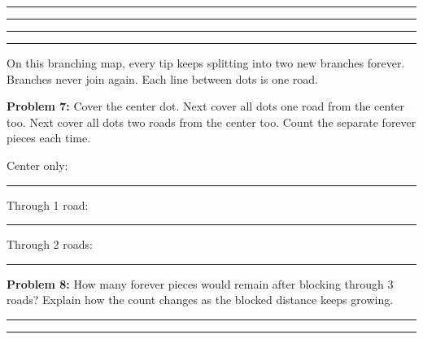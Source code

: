 \documentclass[12pt,letterpaper]{article}
\newcommand{\problem}[2]{\par\textbf{Problem #1:} #2\par}
\begin{document}
\vspace{.35in}\rule{\linewidth}{.4pt}\par\vspace{.45in}\rule{\linewidth}{.4pt}\par\vspace{.45in}\rule{\linewidth}{.4pt}\par\vspace{.45in}\rule{\linewidth}{.4pt}

\newpage

On this branching map, every tip keeps splitting into two new branches forever. Branches never join again. Each line between dots is one road.

\problem{7}{Cover the center dot. Next cover all dots one road from the center too. Next cover all dots two roads from the center too. Count the separate forever pieces each time.}

\begin{center}
\end{center}
Center only: \rule{.6in}{.4pt}\hfill Through 1 road: \rule{.6in}{.4pt}\hfill Through 2 roads: \rule{.6in}{.4pt}

\problem{8}{How many forever pieces would remain after blocking through 3 roads? Explain how the count changes as the blocked distance keeps growing.}

\vspace{.25in}\rule{\linewidth}{.4pt}\par\vspace{.3in}\rule{\linewidth}{.4pt}
\end{document}
